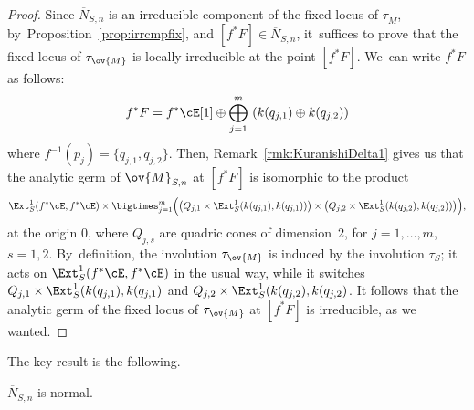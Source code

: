\begin{proof}
Since $\overline{N}_{S,n}$ is an irreducible component of the fixed locus of $\tau_{\overline{M}}$, by~Proposition~\ref{prop:irrcmpfix}, and $[f^*F]\in \overline{N}_{S,n}$, it~suffices to prove that the fixed locus of $\tau_{\ov{M}}$ is locally irreducible at the point $[f^*F]$. We~can write $f^*F$ as follows:\vspace*{-3pt}
\[
f^*F=f^*\cE[1]\oplus \bigoplus_{j=1}^m\, \left(k(q_{j,1})\oplus k(q_{j,2})\right)
\]
where $f^{-1}(p_j)=\{q_{j,1},q_{j,2}\}$.
Then, Remark~\ref{rmk:KuranishiDelta1} gives us that the analytic germ of $\ov{M}_{S,n}$ at $[f^*F]$ is isomorphic to the product\vspace*{-3pt}
\[
\Ext^1_S(f^*\cE,f^*\cE)\times\bigtimes_{j=1}^m \Bigl(\left(Q_{j,1}\times \Ext^1_S(k(q_{j,1}),k(q_{j,1}))\right)\times\left(Q_{j,2}\times \Ext^1_S(k(q_{j,2}),k(q_{j,2}))\right)\Bigr),
\]
at the origin $0$, where $Q_{j,s}$ are quadric cones of dimension~2, for $j=1,\dots,m$, $s=1,2$. By~definition, the involution $\tau_{\ov{M}}$ is induced by the involution $\tau_S$; it acts on $\Ext^1_S(f^*\cE,f^*\cE)$ in the usual way, while it switches $Q_{j,1}\times \Ext^1_S(k(q_{j,1}),k(q_{j,1})$ and $Q_{j,2}\times \Ext^1_S(k(q_{j,2}),k(q_{j,2})$.
It follows that the analytic germ of the fixed locus of $\tau_{\ov{M}}$ at $[f^*F]$ is irreducible, as we wanted.
\end{proof}

The key result is the following.

\begin{prop}\label{prop:ennebarnorm}
$\overline{N}_{S,n}$ is normal.
\end{prop}

